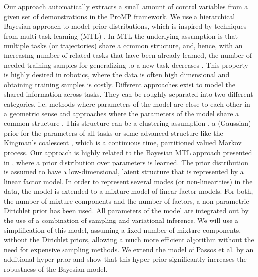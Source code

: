 Our approach automatically extracts a small amount of control variables from a given set of demonstrations in the ProMP framework. 
We use a hierarchical Bayesian approach to model prior distributions, which is inspired by techniques from multi-task learning (MTL) \cite{yu05,lazaric10,daume12,ruvolo14}.
In MTL the underlying assumption is that multiple tasks (or trajectories) share a common structure, and, hence, with 
an increasing number of related tasks that have been already learned, the number of needed training samples for generalizing to a new task decreases \cite{baxter00}. 
This property is highly desired in robotics, where the data is often high dimensional and obtaining training samples is costly.
Different approaches exist to model the shared information across tasks. They can be roughly separated into two different categories, i.e. 
methods where parameters of the model are close to each other in a geometric sense \cite{evgeniou04,ruvolo14} and approaches 
where the parameters of the model share a common structure \cite{yu05,xue07,daume09,lazaric10,rai10,passos12}. 
This structure can be a clustering assumption \cite{xue07}, a (Gaussian) prior for the parameters of all tasks \cite{yu05,lazaric10} 
or some advanced structure like the Kingman's coalescent \cite{daume09}, which is a continuous time, partitioned valued Markov process. 
Our approach is highly related to the Bayesian MTL approach presented in \cite{passos12}, 
where a prior distribution over parameters is learned. 
The prior distribution is assumed to have a low-dimensional, latent structure that is represented by a linear factor model. In 
 order to represent several modes (or non-linearities) in the data, the model is extended to a mixture model of linear factor models.
 For both, the number of mixture components and the number of factors, a non-parametric Dirichlet prior has been used.
 All parameters of the model are integrated out by the use of a combination of sampling and variational inference. 
 We will use a simplification of this model, assuming a fixed number of mixture components, without the Dirichlet priors, 
 allowing a much more efficient algorithm without the need for expensive sampling methods. 
 We extend the model of Passos et al. by an additional hyper-prior and show that this hyper-prior significantly increases the robustness of the Bayesian model.
 
